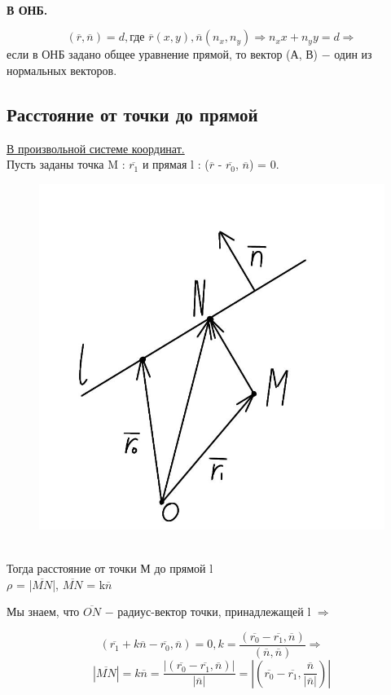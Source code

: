 \tab\\
\textbf{В ОНБ.} 

\[
(\overline{r}, \overline{n}) = d, \text{где } \overline{r}(x, y), \overline{n}(n_x, n_y) \Longrightarrow n_x x + n_y y = d \Longrightarrow
\] если в ОНБ задано общее уравнение прямой, то вектор (А, В) $-$ один из нормальных векторов.

\subsection{Расстояние от точки до прямой}

\underline{В произвольной системе координат.}\\

Пусть заданы точка M : $\overline{r_1}$ и прямая l : ($\overline{r}$ - $\overline{r_0}$, $\overline{n}$) = 0.

\begin{figure}
	\includegraphics[width=0.84\linewidth]{images/1.3.jpeg}
\end{figure}

\tab\\

Тогда расстояние от точки М до прямой l \\
$\rho$ = |$\overline{MN}$|, $\overline{MN}$ = k$\overline{n}$

Мы знаем, что $\overline{ON}$ $-$ радиус-вектор точки, принадлежащей l $\Longrightarrow$ 

\[
(\overline{r_1} + k\overline{n} - \overline{r_0}, \overline{n}) = 0, k = \dfrac{(\overline{r_0} - \overline{r_1}, \overline{n})}{(\overline{n}, \overline{n})} \Longrightarrow
\]
\[
|\overline{MN}| = k\overline{n} = \dfrac{|(\overline{r_0} - \overline{r_1}, \overline{n})|}{|\overline{n}|} = |(\overline{r_0} - \overline{r_1}, \dfrac{\overline{n}}{|\overline{n}|})|
\]

